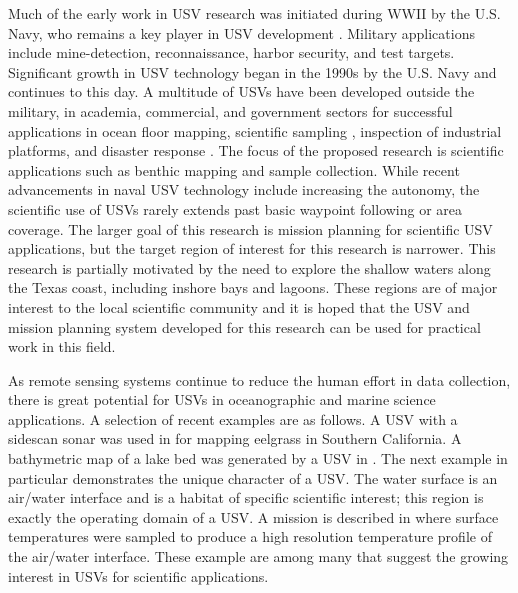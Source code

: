 \documentclass{tamuccthesis}
\begin{document}
Much of the early work in USV research was initiated during WWII by the U.S. Navy, who remains a key player in USV development \cite{bertram2008unmanned}. Military applications include mine-detection, reconnaissance, harbor security, and test targets. Significant growth in USV technology began in the 1990s by the U.S. Navy and continues to this day. A multitude of USVs have been developed outside the military, in academia, commercial, and government sectors \cite{manley2008unmanned} for successful applications in ocean floor mapping, scientific sampling \cite{cokelet2015use}, inspection of industrial platforms, and disaster response \cite{murphy2009robot}. The focus of the proposed research is scientific applications such as benthic mapping and sample collection. While recent advancements in naval USV technology include increasing the autonomy, the scientific use of USVs rarely extends past basic waypoint following or area coverage. The larger goal of this research is mission planning for scientific USV applications, but the target region of interest for this research is narrower. This research is partially motivated by the need to explore the shallow waters along the Texas coast, including inshore bays and lagoons. These regions are of major interest to the local scientific community and it is hoped that the USV and mission planning system developed for this research can be used for practical work in this field. 

As remote sensing systems continue to reduce the human effort in data collection, there is great potential for USVs in oceanographic and marine science applications. A selection of recent examples are as follows. A USV with a sidescan sonar was used in \cite{klemens2017development} for mapping eelgrass in Southern California. A bathymetric map of a lake bed was generated by a USV in \cite{watanabe2016field}. The next example in particular demonstrates the unique character of a USV. The water surface is an air/water interface and is a habitat of specific scientific interest; this region is exactly the operating domain of a USV. A mission is described in \cite{powers2017mobile} where surface temperatures were sampled to produce a high resolution temperature profile of the air/water interface. These example are among many that suggest the growing interest in USVs for scientific applications. 
\end{document}
